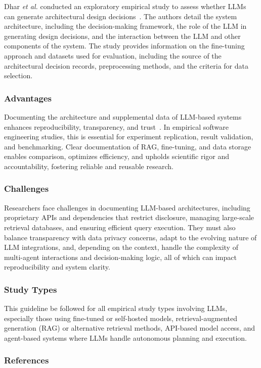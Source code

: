 Dhar \textit{et al.} conducted an exploratory empirical study to assess whether LLMs can generate architectural design decisions~\cite{DBLP:conf/icsa/DharVV24}. The authors detail the system architecture, including the decision-making framework, the role of the LLM in generating design decisions, and the interaction between the LLM and other components of the system. The study provides information on the fine-tuning approach and datasets used for evaluation, including the source of the architectural decision records, preprocessing methods, and the criteria for data selection. 

\subsubsection{Advantages}

Documenting the architecture and supplemental data of LLM-based systems enhances reproducibility, transparency, and trust~\cite{DBLP:journals/software/LuZXXW24}. In empirical software engineering studies, this is essential for experiment replication, result validation, and benchmarking. Clear documentation of RAG, fine-tuning, and data storage enables comparison, optimizes efficiency, and upholds scientific rigor and accountability, fostering reliable and reusable research.

\subsubsection{Challenges}

Researchers face challenges in documenting LLM-based architectures, including proprietary APIs and dependencies that restrict disclosure, managing large-scale retrieval databases, and ensuring efficient query execution. They must also balance transparency with data privacy concerns, adapt to the evolving nature of LLM integrations, and, depending on the context, handle the complexity of multi-agent interactions and decision-making logic, all of which can impact reproducibility and system clarity.

\subsubsection{Study Types}

This guideline \must be followed for all empirical study types involving LLMs, especially those using fine-tuned or self-hosted models, retrieval-augmented generation (RAG) or alternative retrieval methods, API-based model access, and agent-based systems where LLMs handle autonomous planning and execution.

\subsubsection{References}





